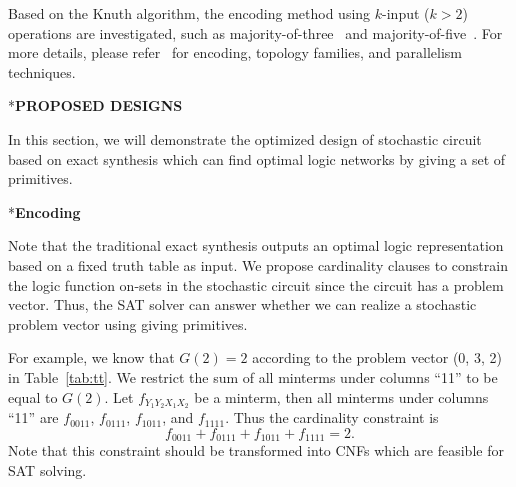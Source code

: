 \documentclass[conference,letterpaper]{IEEEtran}
\makeatletter
\renewcommand{\section}{\@startsection{section}{1}{0mm}
    {-\baselineskip}{0.001\baselineskip}{\bf\leftline}}
\renewcommand{\subsection}{\@startsection{subsection}{1}{0mm}
	{-\baselineskip}{0.001\baselineskip}{\bf\leftline}}
\makeatother
\begin{document}
Based on the Knuth algorithm, the encoding method using $k$-input ($k > 2$) operations are investigated, such as majority-of-three~\cite{Majority-of-Three} and majority-of-five~\cite{Majority-of-Five}. For more details, please refer~\cite{SAT-Based-Exact} 
 for encoding, topology families, and parallelism techniques.

\section*{\textbf{\large PROPOSED DESIGNS}}

In this section, we will demonstrate the optimized design of stochastic circuit based on exact synthesis which can find optimal logic networks by giving a set of primitives.
\subsection*{\textbf{Encoding }}




Note that the traditional exact synthesis outputs an optimal logic representation based on a fixed truth table as input.
We propose cardinality clauses to constrain the logic function on-sets in the stochastic circuit since the circuit has a problem vector. Thus, the SAT solver can answer whether we can realize a stochastic problem vector using giving primitives. 

For example, we know that $G(2) = 2$ according to the problem vector (0, 3, 2) in Table~\ref{tab:tt}. We restrict the sum of all minterms under columns ``11'' to be equal to $G(2)$. 
Let $f_{Y_1Y_2X_1X_2}$ be a minterm, then all minterms under columns ``11''
are $f_{0011}$, $f_{0111}$, $f_{1011}$, and $f_{1111}$.
Thus the cardinality constraint is \vspace{-0.5ex}
\begin{equation}
f_{0011} + f_{0111} + f_{1011} + f_{1111} = 2.
\end{equation}
Note that this constraint should be transformed into CNFs which are feasible for SAT solving.
\end{document}
